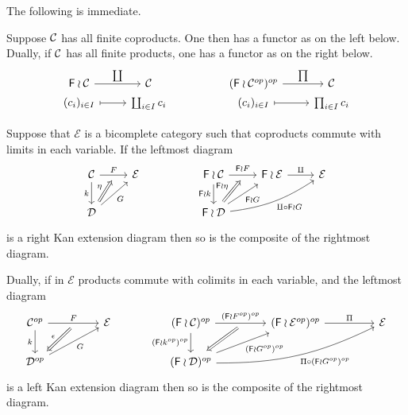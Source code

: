 \documentclass[a4paper,10pt]{article}%
\begin{document}
 The following is immediate.

\begin{proposition}
	Suppose $\mathcal{C}$ has all finite coproducts. One then has a functor as on the left below.
Dually, if $\mathcal{C}$ has all finite products, one has a functor as on the right below.
\[
\begin{tikzcd}[row sep=0pt]
	\Fin \wr \C \ar{r}{\coprod} & \C & &
	(\Fin \wr \C^{op})^{op} \ar{r}{\prod} & \C
\\
	(c_i)_{i \in I} \ar[mapsto]{r} & \coprod_{i \in I}{c_i} & &
	(c_i)_{i \in I} \ar[mapsto]{r} & \prod_{i \in I}{c_i}
\end{tikzcd}
\]
\end{proposition}



\begin{lemma}\label{FINWREATPRODLIM LEM}
Suppose that $\mathcal{E}$ is a bicomplete category such that 
coproducts commute with limits in each variable. If the leftmost diagram
\begin{equation}\label{WRRAN EQ}
	\begin{tikzcd}
	\mathcal{C} \ar{r}[swap,name=F]{}{F} \ar{d}[swap]{k} &
	\mathcal{E} & 
	& 
	\Fin \wr \mathcal{C} \ar{r}[swap,name=FF]{}{\Fin \wr F} \ar{d}[swap]{\Fin \wr k}&
	\Fin \wr \mathcal{E} \ar{r}{\amalg} &
	\mathcal{E}
		\\
	|[alias=D]|\mathcal{D} \ar{ru}[swap]{G} &
	& & 
	|[alias=FD]|\Fin \wr \mathcal{D} \ar{ru}[swap]{\Fin \wr G}
	\ar[bend right=13]{rru}[swap]{\amalg \circ \Fin \wr G}
	\arrow[Rightarrow, from=D, to=F,shorten <=0.10cm,"\eta"]
	\arrow[Rightarrow, from=FD, to=FF,shorten <=0.10cm,"\Fin \wr \eta"]
	\end{tikzcd}
\end{equation}
is a right Kan extension diagram then so is the composite of the rightmost diagram. 

Dually, if in $\mathcal{E}$ products commute with colimits in each variable, and the leftmost diagram
\begin{equation}\label{WRLAN EQ}
	\begin{tikzcd}[column sep = 4.5em]
	\mathcal{C}^{op} \ar{r}[swap,name=F]{}{F} \ar{d}[swap]{k} & 
	\mathcal{E} & 
	(\Fin \wr \mathcal{C})^{op} \ar{d}[swap]{(\Fin \wr k^{op})^{op}} 
	\ar{r}[swap,name=FF]{}{(\Fin \wr F^{op})^{op}} & 
	(\Fin \wr \mathcal{E}^{op})^{op} \ar{r}{\Pi} &
	\mathcal{E}
	\\
	|[alias=D]|\mathcal{D}^{op} \ar{ru}[swap]{G} &
	& 
	|[alias=FD]|(\Fin \wr \mathcal{D})^{op} 
	\ar{ru}[swap]{(\Fin \wr G^{op})^{op}}
	\ar[bend right=13]{rru}[swap]{\Pi \circ (\Fin \wr G^{op})^{op}}
	&
	\arrow[Leftarrow, from=D, to=F,shorten <=0.10cm,"\epsilon"]
	\arrow[Leftarrow, from=FD, to=FF,shorten <=0.10cm]
	\end{tikzcd}
\end{equation}
is a left Kan extension diagram then so is the composite of the rightmost diagram. 
\end{lemma}
\end{document}
